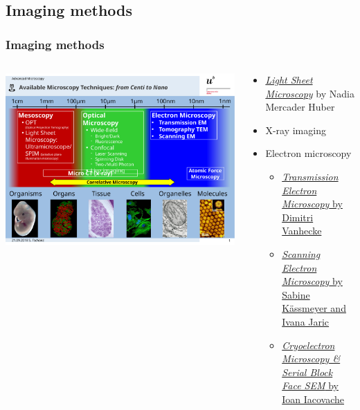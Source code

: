 \begin{frame}
\begin{columns}
\begin{column}{0.38\textwidth}
{%
						}%
				\end{column}%
		\end{columns}%
\end{frame}

\subsection{Imaging methods}
\begin{frame}
		\frametitle{Imaging methods}
		\begin{columns}
				\begin{column}{0.5\textwidth}
						\includegraphics[height=\imageheight]{./images/MIC-AM_techniques}%
				\end{column}
				\begin{column}{0.5\textwidth}
						\begin{itemize}
								\item \href{https://ilias.unibe.ch/goto_ilias3_unibe_sess_3022933.html}{\emph{Light Sheet Microscopy}} by Nadia Mercader Huber
								\item X-ray imaging
								\item Electron microscopy
										\begin{itemize}
												\item \href{https://ilias.unibe.ch/goto_ilias3_unibe_sess_3022941.html}{\emph{Transmission Electron Microscopy} by Dimitri Vanhecke}
												\item \href{https://ilias.unibe.ch/goto_ilias3_unibe_sess_3022943.html}{\emph{Scanning Electron Microscopy} by Sabine Kässmeyer and Ivana Jaric}
												\item \href{https://ilias.unibe.ch/goto_ilias3_unibe_sess_3022945.html}{\emph{Cryoelectron Microscopy \& Serial Block Face SEM} by Ioan Iacovache}
										\end{itemize}
						\end{itemize}
				\end{column}
		\end{columns}
\end{frame}

